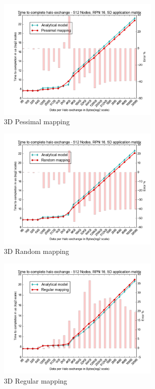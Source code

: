 \documentclass{beamer}
\begin{document}
\begin{frame}
\begin{figure}
\caption{3D Pessimal mapping}
  \includegraphics[width=0.7\textwidth]{../mappings/3d_pessimal.png}
\end{figure}
\end{frame}

\begin{frame}
\begin{figure}
\caption{3D Random mapping}
  \includegraphics[width=0.7\textwidth]{../mappings/3d_random.png}
\end{figure}
\end{frame}

\begin{frame}
\begin{figure}
\caption{3D Regular mapping}
  \includegraphics[width=0.7\textwidth]{../mappings/3d_regular.png}
\end{figure}
\end{frame}
\end{document}
